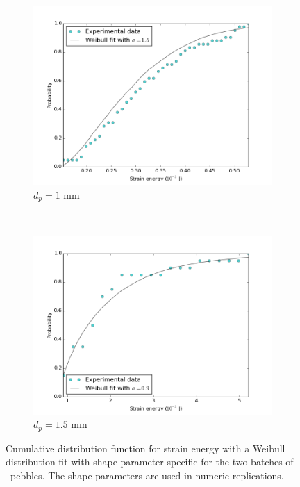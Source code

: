 \begin{figure}
        \centering
        \begin{subfigure}[b]{\doubleimagewidth}
                \includegraphics[width=\textwidth]{figures/nfri-1mm-w-cdf-fit.png}
                \caption{$\bar{d}_p = 1$ mm}
                \label{fig:nfri-1-w-cdf}
        \end{subfigure}
        ~
        \begin{subfigure}[b]{\doubleimagewidth}
                \includegraphics[width=\textwidth]{figures/nfri-1.5mm-w-cdf-fit.png}
                \caption{$\bar{d}_p = 1.5$ mm}
                \label{fig:nfri-1.5-w-cdf}
        \end{subfigure}
        \caption{Cumulative distribution function for strain energy with a Weibull distribution fit with shape parameter specific for the two batches of \lit~pebbles. The shape parameters are used in numeric replications.}\label{fig:nfri-w-cdf}
\end{figure}



